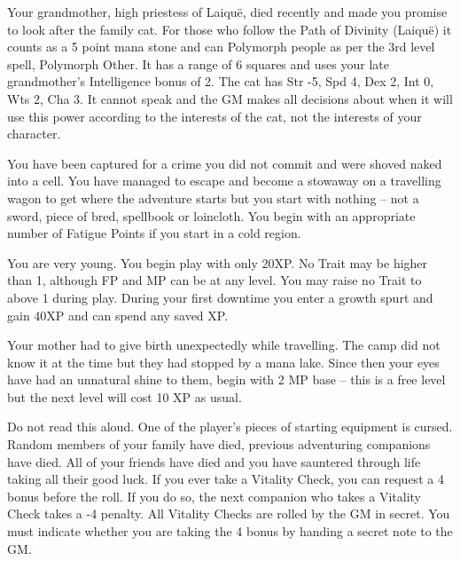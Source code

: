 \begin{multicols}{2}
\begin{list}{\addtocounter{list}{1}\textbf{:}}{\raggedleft}
\item{Your grandmother, high priestess of Laiqu\"{e}, died recently and made you promise to look after the family cat.  For those who follow the Path of Divinity (Laiqu\"{e}) it counts as a 5 point mana stone and can Polymorph people as per the 3rd level spell, Polymorph Other.  It has a range of 6 squares and uses your late grandmother's Intelligence bonus of 2.  The cat has Str -5, Spd 4, Dex 2, Int 0, Wts 2, Cha 3.  It cannot speak and the GM makes all decisions about when it will use this power according to the interests of the cat, not the interests of your character.}

\item{You have been captured for a crime you did not commit and were shoved naked into a cell.  You have managed to escape and become a stowaway on a travelling wagon to get where the adventure starts but you start with nothing -- not a sword, piece of bred, spellbook or loincloth.  You begin with an appropriate number of Fatigue Points if you start in a cold region.}

\item{ You are very young.  You begin play with only 20XP.  No Trait may be higher than 1, although FP and MP can be at any level.  You may raise no Trait to above 1 during play.  During your first downtime you enter a growth spurt and gain 40XP and can spend any saved XP. }

\item{ Your mother had to give birth unexpectedly while travelling.  The camp did not know it at the time but they had stopped by a mana lake.  Since then your eyes have had an unnatural shine to them, begin with 2 MP base -- this is a free level but the next level will cost 10 XP as usual. }

\item{ Do not read this aloud.  One of the player's pieces of starting equipment is cursed.  Random members of your family have died, previous adventuring companions have died.  All of your friends have died and you have sauntered through life taking all their good luck.  If you ever take a Vitality Check, you can request a 4 bonus before the roll.  If you do so, the next companion who takes a Vitality Check takes a -4 penalty.  All Vitality Checks are rolled by the GM in secret.  You must indicate whether you are taking the 4 bonus by handing a secret note to the GM. }


\end{list}
\end{multicols}
